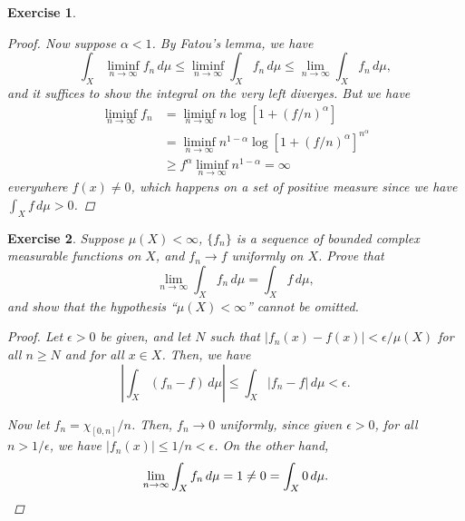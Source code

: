 \documentclass[10pt,letterpaper]{amsart}
\newtheorem{exercise}{Exercise}[section]
\theoremstyle{definition}
\theoremstyle{remark}
\numberwithin{equation}{exercise}
\begin{document}
\begin{multicols}{2}
\begin{exercise}
\begin{proof}
      \par Now suppose $\alpha < 1$. By Fatou's lemma, we have
      \begin{equation*}
        \int_X \liminf_{n \to \infty} f_n\,d\mu \le \liminf_{n \to \infty}\int_X
        f_n\,d\mu \le \lim_{n \to \infty} \int_X f_n\,d\mu,
      \end{equation*}
      and it suffices to show the integral on the very left diverges. But we
      have
      \begin{align*}
        \liminf_{n \to \infty} f_n &= \liminf_{n \to \infty}
        n\log[1+(f/n)^\alpha]\\
        &= \liminf_{n \to \infty} n^{1-\alpha}\log[1+(f/n)^\alpha]^{n^\alpha}\\
        &\ge f^\alpha\liminf_{n \to \infty} n^{1-\alpha} = \infty
      \end{align*}
      everywhere $f(x) \ne 0$, which happens on a set of positive measure since
      we have $\int_X f\,d\mu > 0$.
    \end{proof}
  \end{exercise}
  \begin{exercise}
    Suppose $\mu(X) < \infty$, $\{f_n\}$ is a sequence of bounded complex
    measurable functions on $X$, and $f_n \to f$ uniformly on $X$. Prove that
    \begin{equation*}
      \lim_{n \to \infty} \int_X f_n\,d\mu = \int_X f\,d\mu,
    \end{equation*}
    and show that the hypothesis ``$\mu(X) < \infty$'' cannot be omitted.
    \begin{proof}
      Let $\epsilon > 0$ be given, and let $N$ such that $\lvert f_n(x) - f(x)
      \rvert < \epsilon/\mu(X)$ for all $n \ge N$ and for all $x \in X$.
      Then, we have
      \begin{equation*}
        \left\lvert \int_X (f_n - f)\,d\mu \right\rvert \le \int_X \lvert f_n -
        f \rvert\,d\mu < \epsilon.
      \end{equation*}
      \par Now let $f_n = \chi_{[0,n]}/n$. Then, $f_n \to 0$ uniformly, since
      given $\epsilon > 0$, for all $n > 1/\epsilon$, we have $\lvert f_n(x)
      \rvert \le 1/n < \epsilon$. On the other hand,
      \begin{equation*}
        \lim_{n \to \infty} \int_X f_n\,d\mu = 1 \ne 0 = \int_X 0\,d\mu.\qedhere
      \end{equation*}
    \end{proof}
  \end{exercise}

\end{multicols}
\end{document}
